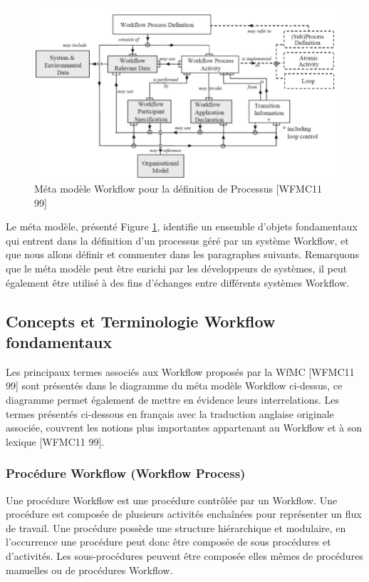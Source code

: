  	 
 	 
 	 
\begin{figure}[h]
	\centering
	\includegraphics[width=0.7\linewidth]{images/MetaMWFMC11-99}
	\caption{Méta modèle Workflow pour la définition de Processus [WFMC11 99]}
	\label{fig:metamwfmc11-99}
\end{figure}
 	 
 	 Le méta modèle, présenté Figure \ref{fig:metamwfmc11-99}, identifie un ensemble d’objets fondamentaux qui entrent dans la définition d’un processus géré par un système Workflow, et que nous allons définir et commenter dans les paragraphes suivants. Remarquons que le méta modèle peut être enrichi par les développeurs de systèmes, il peut également être utilisé à des fins d’échanges entre différents systèmes Workflow.
 	 
 	\subsection{Concepts et Terminologie Workflow fondamentaux } 
 	 
 	 Les principaux termes associés aux Workflow proposés par la WfMC [WFMC11 99] sont présentés dans le diagramme du méta modèle Workflow ci-dessus, ce diagramme permet également de mettre en évidence leurs interrelations. Les termes présentés ci-dessous en français avec la traduction anglaise originale associée, couvrent les notions plus importantes appartenant au Workflow et à son lexique [WFMC11 99]. 
 	 
 	 \subsubsection{Procédure Workflow (Workflow Process) }
 	 
 	 Une procédure Workflow est une procédure contrôlée par un Workflow. Une procédure est composée de plusieurs activités enchaînées pour représenter un flux de travail. Une procédure possède une structure hiérarchique et modulaire, en l’occurrence une procédure peut donc être composée de sous procédures et d’activités. Les sous-procédures peuvent être composée elles mêmes de procédures manuelles ou de procédures Workflow.
 	 

